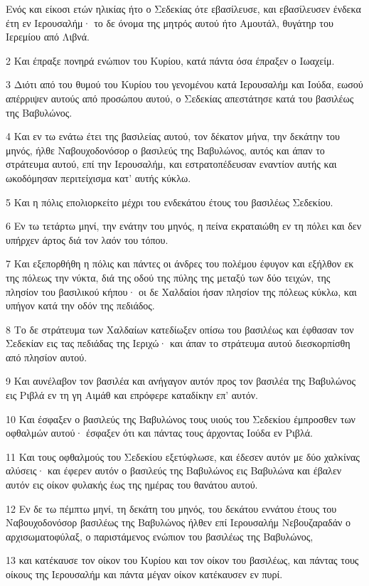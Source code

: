 \par Ενός και είκοσι ετών ηλικίας ήτο ο Σεδεκίας ότε εβασίλευσε, και εβασίλευσεν ένδεκα έτη εν Ιερουσαλήμ· το δε όνομα της μητρός αυτού ήτο Αμουτάλ, θυγάτηρ του Ιερεμίου από Λιβνά.
\par 2 Και έπραξε πονηρά ενώπιον του Κυρίου, κατά πάντα όσα έπραξεν ο Ιωαχείμ.
\par 3 Διότι από του θυμού του Κυρίου του γενομένου κατά Ιερουσαλήμ και Ιούδα, εωσού απέρριψεν αυτούς από προσώπου αυτού, ο Σεδεκίας απεστάτησε κατά του βασιλέως της Βαβυλώνος.
\par 4 Και εν τω ενάτω έτει της βασιλείας αυτού, τον δέκατον μήνα, την δεκάτην του μηνός, ήλθε Ναβουχοδονόσορ ο βασιλεύς της Βαβυλώνος, αυτός και άπαν το στράτευμα αυτού, επί την Ιερουσαλήμ, και εστρατοπέδευσαν εναντίον αυτής και ωκοδόμησαν περιτείχισμα κατ' αυτής κύκλω.
\par 5 Και η πόλις επολιορκείτο μέχρι του ενδεκάτου έτους του βασιλέως Σεδεκίου.
\par 6 Εν τω τετάρτω μηνί, την ενάτην του μηνός, η πείνα εκραταιώθη εν τη πόλει και δεν υπήρχεν άρτος διά τον λαόν του τόπου.
\par 7 Και εξεπορθήθη η πόλις και πάντες οι άνδρες του πολέμου έφυγον και εξήλθον εκ της πόλεως την νύκτα, διά της οδού της πύλης της μεταξύ των δύο τειχών, της πλησίον του βασιλικού κήπου· οι δε Χαλδαίοι ήσαν πλησίον της πόλεως κύκλω, και υπήγον κατά την οδόν της πεδιάδος.
\par 8 Το δε στράτευμα των Χαλδαίων κατεδίωξεν οπίσω του βασιλέως και έφθασαν τον Σεδεκίαν εις τας πεδιάδας της Ιεριχώ· και άπαν το στράτευμα αυτού διεσκορπίσθη από πλησίον αυτού.
\par 9 Και αυνέλαβον τον βασιλέα και ανήγαγον αυτόν προς τον βασιλέα της Βαβυλώνος εις Ριβλά εν τη γη Αιμάθ και επρόφερε καταδίκην επ' αυτόν.
\par 10 Και έσφαξεν ο βασιλεύς της Βαβυλώνος τους υιούς του Σεδεκίου έμπροσθεν των οφθαλμών αυτού· έσφαξεν ότι και πάντας τους άρχοντας Ιούδα εν Ριβλά.
\par 11 Και τους οφθαλμούς του Σεδεκίου εξετύφλωσε, και έδεσεν αυτόν με δύο χαλκίνας αλύσεις· και έφερεν αυτόν ο βασιλεύς της Βαβυλώνος εις Βαβυλώνα και έβαλεν αυτόν εις οίκον φυλακής έως της ημέρας του θανάτου αυτού.
\par 12 Εν δε τω πέμπτω μηνί, τη δεκάτη του μηνός, του δεκάτου εννάτου έτους του Ναβουχοδονόσορ βασιλέως της Βαβυλώνος ήλθεν επί Ιερουσαλήμ Νεβουζαραδάν ο αρχισωματοφύλαξ, ο παριστάμενος ενώπιον του βασιλέως της Βαβυλώνος,
\par 13 και κατέκαυσε τον οίκον του Κυρίου και τον οίκον του βασιλέως, και πάντας τους οίκους της Ιερουσαλήμ και πάντα μέγαν οίκον κατέκαυσεν εν πυρί.
